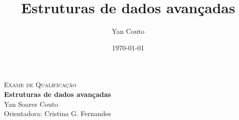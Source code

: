 \documentclass[11pt,oneside,a4paper, openany]{book}
\title{Estruturas de dados avançadas}
\author{Yan Couto}
\date{\today}
\begin{document}
\mainmatter

\begin{center}
	\textsc{Exame de Qualificação} \\[2ex]
	\textbf{\huge{Estruturas de dados avançadas}}\\[2ex]

	\Large{Yan Soares Couto} \\[2ex]

	Orientadora: Cristina G. Fernandes\\[5ex]
\end{center}














\end{document}
